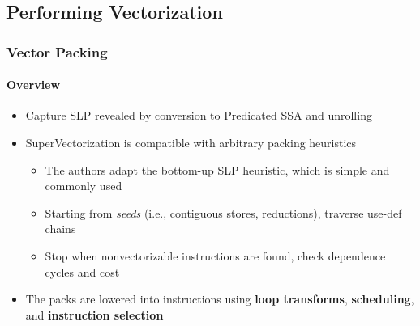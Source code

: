 \documentclass[aspectratio=169]{beamer}
\begin{document}
\subsection{Performing Vectorization}
\begin{frame}
  \frametitle{Vector Packing}
  \framesubtitle{Overview}

  \begin{itemize}
    \item Capture SLP revealed by conversion to Predicated SSA and unrolling
    \item SuperVectorization is compatible with arbitrary packing heuristics
    \pause
    \begin{itemize}
      \item The authors adapt the bottom-up SLP heuristic, which is simple and commonly used
      \item Starting from \textit{seeds} (i.e., contiguous stores, reductions), traverse use-def chains
      \item Stop when nonvectorizable instructions are found, check dependence cycles and cost
    \end{itemize}
    \pause
    \item The packs are lowered into instructions using {\bfseries loop transforms}, {\bfseries scheduling}, and {\bfseries instruction selection}
  \end{itemize}
\end{frame}
\end{document}
